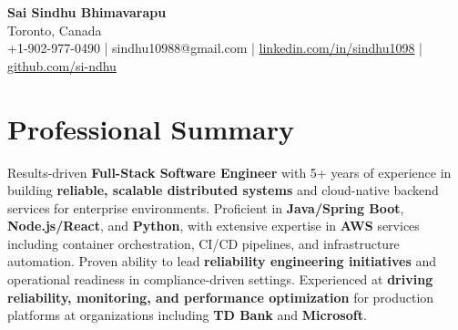\documentclass[letterpaper,11pt]{article}
\begin{document}
\begin{center}
  {\Large \textbf{Sai Sindhu Bhimavarapu}} \\
  Toronto, Canada \\
  +1-902-977-0490 \enspace | \enspace sindhu10988@gmail.com \enspace | \enspace \href{https://www.linkedin.com/in/sindhu1098/}{linkedin.com/in/sindhu1098} \enspace | \enspace \href{https://github.com/si-ndhu}{github.com/si-ndhu}
\end{center}

\section{Professional Summary}
  \begin{itemize}[leftmargin=0.15in, label={}]
    \small{\item{
     Results-driven \textbf{Full-Stack Software Engineer} with 5+ years of experience in building \textbf{reliable, scalable distributed systems} and cloud-native backend services for enterprise environments. Proficient in \textbf{Java/Spring Boot}, \textbf{Node.js/React}, and \textbf{Python}, with extensive expertise in \textbf{AWS} services including container orchestration, CI/CD pipelines, and infrastructure automation. Proven ability to lead \textbf{reliability engineering initiatives} and operational readiness in compliance-driven settings. Experienced at \textbf{driving reliability, monitoring, and performance optimization} for production platforms at organizations including \textbf{TD Bank} and \textbf{Microsoft}.
    }}
  \end{itemize}
\vspace{-16pt}

\end{document}
